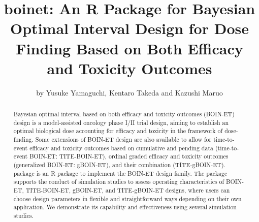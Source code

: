 
\renewcommand{\labelenumii}{\arabic{enumi}-\arabic{enumii}}
\renewcommand{\arraystretch}{1.3}

\title{boinet: An R Package for Bayesian Optimal Interval Design for Dose Finding Based on Both Efficacy and Toxicity Outcomes}
\author{by Yusuke Yamaguchi, Kentaro Takeda and Kazushi Maruo}

\maketitle

\begin{abstract}
Bayesian optimal interval based on both efficacy and toxicity outcomes (BOIN-ET) design is a model-assisted oncology phase I/II trial design, aiming to establish an optimal biological dose accounting for efficacy and toxicity in the framework of dose-finding. Some extensions of BOIN-ET design are also available to allow for time-to-event efficacy and toxicity outcomes based on cumulative and pending data (time-to-event BOIN-ET: TITE-BOIN-ET), ordinal graded efficacy and toxicity outcomes (generalized BOIN-ET: gBOIN-ET), and their combination (TITE-gBOIN-ET).  package is an R package to implement the BOIN-ET design family. The package supports the conduct of simulation studies to assess operating characteristics of BOIN-ET, TITE-BOIN-ET, gBOIN-ET, and TITE-gBOIN-ET designs, where users can choose design parameters in flexible and straightforward ways depending on their own application. We demonstrate its capability and effectiveness using several simulation studies.
\end{abstract}

